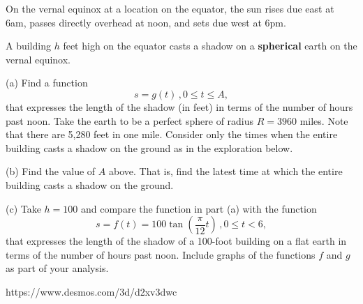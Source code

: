\documentclass{ximera}
\begin{document}
\begin{question}  \label{Q4:SineCosine}
On the vernal equinox at a location on the equator, the sun rises due east at 6am, passes directly overhead at noon, and sets due west at 6pm. 

A building $h$ feet high on the equator casts a shadow on a {\bf spherical} earth on the vernal equinox. 

(a) Find a function
\[
   s = g(t) \, , 0\leq t \leq A ,
\]
that expresses the length of the shadow (in feet) in terms of the number of hours past noon. Take the earth to be a perfect sphere of radius $R=3960$ miles. Note that there are 5,280 feet in one mile. Consider only the times when the entire building casts a shadow on the ground as in the exploration below.

(b) Find the value of $A$ above. That is, find the latest time at which the entire building casts a shadow on the ground.

(c) Take $h=100$ and compare the function in part (a) with the function 
\[
  s = f(t) = 100 \tan \left( \frac{\pi}{12}t \right) \, , 0\leq t < 6 ,
\]
that expresses the length of the shadow of a 100-foot building on a flat earth in terms of the number of hours past noon. Include graphs of the functions $f$ and $g$ as part of your analysis.

\begin{exploration}

 
\begin{onlineOnly}
    \begin{center}
\end{center}
\end{onlineOnly}
\end{exploration} 

\end{question}




https://www.desmos.com/3d/d2xv3dwc



 
\begin{onlineOnly}
    \begin{center}
\end{center}
\end{onlineOnly}
\end{document}
